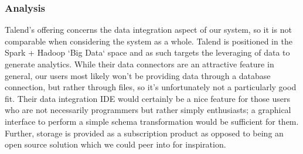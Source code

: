 \subsubsection{Analysis}\label{analysis-2}

Talend's offering concerns the data integration aspect of our system, so
it is not comparable when considering the system as a whole. Talend is
positioned in the Spark + Hadoop `Big Data` space and as such targets the
leveraging of data to generate analytics. While their data connectors are
an attractive feature in general, our users most likely won't be providing
data through a database connection, but rather through files, so it's
unfortunately not a particularly good fit. Their data integration IDE would
certainly be a nice feature for those users who are not necessarily programmers
but rather simply enthusiasts; a graphical interface to perform a simple
schema transformation would be sufficient for them. Further, storage is provided
as a subscription product as opposed to being an open source solution which
we could peer into for inspiration.
